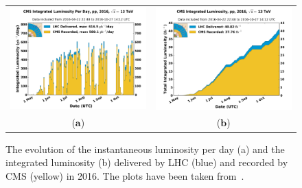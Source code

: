 \begin{figure}[htp]
\centering
\begin{tabular}{cc}
\hspace{-0.3cm}
\includegraphics[scale=0.39]{fig/lhc/int_lumi_per_day_pp_2016.png}
& \hspace{-0.5cm} \includegraphics[scale=0.39]{fig/lhc/int_lumi_per_day_cumulative_pp_2016.png}\\
   ($\mathbf{a}$)\qquad&($\mathbf{b}$)\qquad\\
\end{tabular}
\caption{The evolution of the instantaneous luminosity per day (a) and the integrated luminosity (b) delivered by LHC (blue) and recorded by CMS (yellow) in 2016. The plots have been taken from~\cite{twiki:cms_lumi}.}\label{fig:cms_lumi}
\end{figure}

